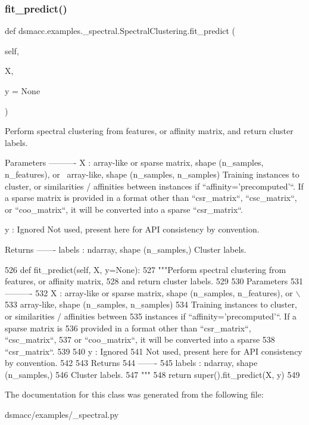 \subsubsection{\texorpdfstring{fit\+\_\+predict()}{fit\_predict()}}
{\footnotesize\ttfamily def dsmacc.\+examples.\+\_\+spectral.\+Spectral\+Clustering.\+fit\+\_\+predict (\begin{DoxyParamCaption}\item[{}]{self,  }\item[{}]{X,  }\item[{}]{y = {\ttfamily None} }\end{DoxyParamCaption})}

\begin{DoxyVerb}Perform spectral clustering from features, or affinity matrix,
and return cluster labels.

Parameters
----------
X : array-like or sparse matrix, shape (n_samples, n_features), or \
    array-like, shape (n_samples, n_samples)
    Training instances to cluster, or similarities / affinities between
    instances if ``affinity='precomputed'``. If a sparse matrix is
    provided in a format other than ``csr_matrix``, ``csc_matrix``,
    or ``coo_matrix``, it will be converted into a sparse
    ``csr_matrix``.

y : Ignored
    Not used, present here for API consistency by convention.

Returns
-------
labels : ndarray, shape (n_samples,)
    Cluster labels.
\end{DoxyVerb}
 
\begin{DoxyCode}
526     \textcolor{keyword}{def }fit\_predict(self, X, y=None):
527         \textcolor{stringliteral}{"""Perform spectral clustering from features, or affinity matrix,}
528 \textcolor{stringliteral}{        and return cluster labels.}
529 \textcolor{stringliteral}{}
530 \textcolor{stringliteral}{        Parameters}
531 \textcolor{stringliteral}{        ----------}
532 \textcolor{stringliteral}{        X : array-like or sparse matrix, shape (n\_samples, n\_features), or \(\backslash\)}
533 \textcolor{stringliteral}{            array-like, shape (n\_samples, n\_samples)}
534 \textcolor{stringliteral}{            Training instances to cluster, or similarities / affinities between}
535 \textcolor{stringliteral}{            instances if ``affinity='precomputed'``. If a sparse matrix is}
536 \textcolor{stringliteral}{            provided in a format other than ``csr\_matrix``, ``csc\_matrix``,}
537 \textcolor{stringliteral}{            or ``coo\_matrix``, it will be converted into a sparse}
538 \textcolor{stringliteral}{            ``csr\_matrix``.}
539 \textcolor{stringliteral}{}
540 \textcolor{stringliteral}{        y : Ignored}
541 \textcolor{stringliteral}{            Not used, present here for API consistency by convention.}
542 \textcolor{stringliteral}{}
543 \textcolor{stringliteral}{        Returns}
544 \textcolor{stringliteral}{        -------}
545 \textcolor{stringliteral}{        labels : ndarray, shape (n\_samples,)}
546 \textcolor{stringliteral}{            Cluster labels.}
547 \textcolor{stringliteral}{        """}
548         \textcolor{keywordflow}{return} super().fit\_predict(X, y)
549 
\end{DoxyCode}


The documentation for this class was generated from the following file\+:\begin{DoxyCompactItemize}
\item 
dsmacc/examples/\+\_\+spectral.\+py\end{DoxyCompactItemize}
